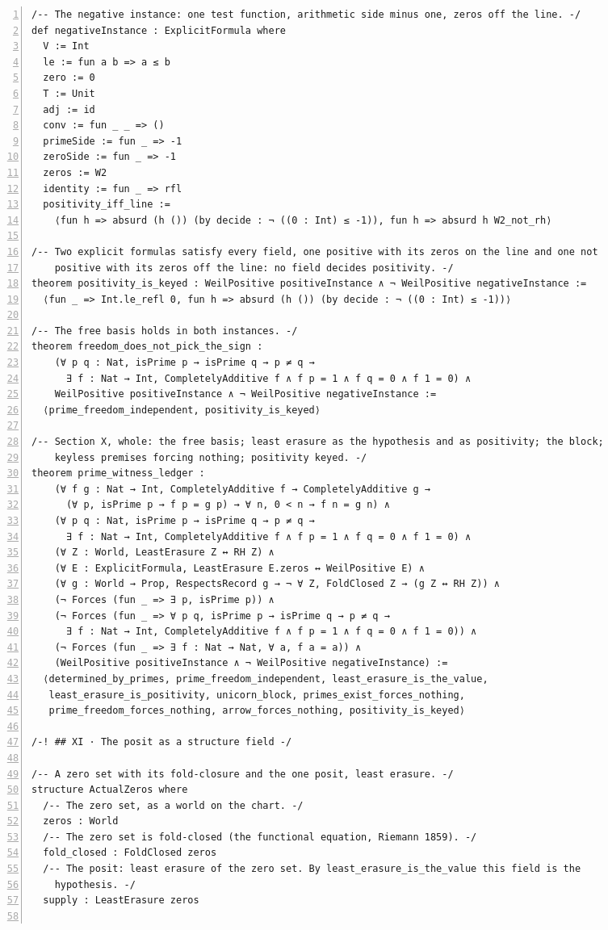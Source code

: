 \documentclass[10pt]{article}
\newcommand{\leansize}{\fontsize{5.5pt}{6.75pt}\selectfont}
\begin{document}
\begin{multicols}{2}
\begin{Verbatim}[numbers=left,firstnumber=1,numbersep=3pt,xleftmargin=2.6em,breaklines=true,breakanywhere=true,breakautoindent=false,breakindent=1.4em,breaksymbolleft={},breakanywheresymbolpre={},fontsize=\leansize]
/-- The negative instance: one test function, arithmetic side minus one, zeros off the line. -/
def negativeInstance : ExplicitFormula where
  V := Int
  le := fun a b => a ≤ b
  zero := 0
  T := Unit
  adj := id
  conv := fun _ _ => ()
  primeSide := fun _ => -1
  zeroSide := fun _ => -1
  zeros := W2
  identity := fun _ => rfl
  positivity_iff_line :=
    ⟨fun h => absurd (h ()) (by decide : ¬ ((0 : Int) ≤ -1)), fun h => absurd h W2_not_rh⟩

/-- Two explicit formulas satisfy every field, one positive with its zeros on the line and one not
    positive with its zeros off the line: no field decides positivity. -/
theorem positivity_is_keyed : WeilPositive positiveInstance ∧ ¬ WeilPositive negativeInstance :=
  ⟨fun _ => Int.le_refl 0, fun h => absurd (h ()) (by decide : ¬ ((0 : Int) ≤ -1))⟩

/-- The free basis holds in both instances. -/
theorem freedom_does_not_pick_the_sign :
    (∀ p q : Nat, isPrime p → isPrime q → p ≠ q →
      ∃ f : Nat → Int, CompletelyAdditive f ∧ f p = 1 ∧ f q = 0 ∧ f 1 = 0) ∧
    WeilPositive positiveInstance ∧ ¬ WeilPositive negativeInstance :=
  ⟨prime_freedom_independent, positivity_is_keyed⟩

/-- Section X, whole: the free basis; least erasure as the hypothesis and as positivity; the block;
    keyless premises forcing nothing; positivity keyed. -/
theorem prime_witness_ledger :
    (∀ f g : Nat → Int, CompletelyAdditive f → CompletelyAdditive g →
      (∀ p, isPrime p → f p = g p) → ∀ n, 0 < n → f n = g n) ∧
    (∀ p q : Nat, isPrime p → isPrime q → p ≠ q →
      ∃ f : Nat → Int, CompletelyAdditive f ∧ f p = 1 ∧ f q = 0 ∧ f 1 = 0) ∧
    (∀ Z : World, LeastErasure Z ↔ RH Z) ∧
    (∀ E : ExplicitFormula, LeastErasure E.zeros ↔ WeilPositive E) ∧
    (∀ g : World → Prop, RespectsRecord g → ¬ ∀ Z, FoldClosed Z → (g Z ↔ RH Z)) ∧
    (¬ Forces (fun _ => ∃ p, isPrime p)) ∧
    (¬ Forces (fun _ => ∀ p q, isPrime p → isPrime q → p ≠ q →
      ∃ f : Nat → Int, CompletelyAdditive f ∧ f p = 1 ∧ f q = 0 ∧ f 1 = 0)) ∧
    (¬ Forces (fun _ => ∃ f : Nat → Nat, ∀ a, f a = a)) ∧
    (WeilPositive positiveInstance ∧ ¬ WeilPositive negativeInstance) :=
  ⟨determined_by_primes, prime_freedom_independent, least_erasure_is_the_value,
   least_erasure_is_positivity, unicorn_block, primes_exist_forces_nothing,
   prime_freedom_forces_nothing, arrow_forces_nothing, positivity_is_keyed⟩

/-! ## XI · The posit as a structure field -/

/-- A zero set with its fold-closure and the one posit, least erasure. -/
structure ActualZeros where
  /-- The zero set, as a world on the chart. -/
  zeros : World
  /-- The zero set is fold-closed (the functional equation, Riemann 1859). -/
  fold_closed : FoldClosed zeros
  /-- The posit: least erasure of the zero set. By least_erasure_is_the_value this field is the
    hypothesis. -/
  supply : LeastErasure zeros


\end{Verbatim}
\end{multicols}
\end{document}
